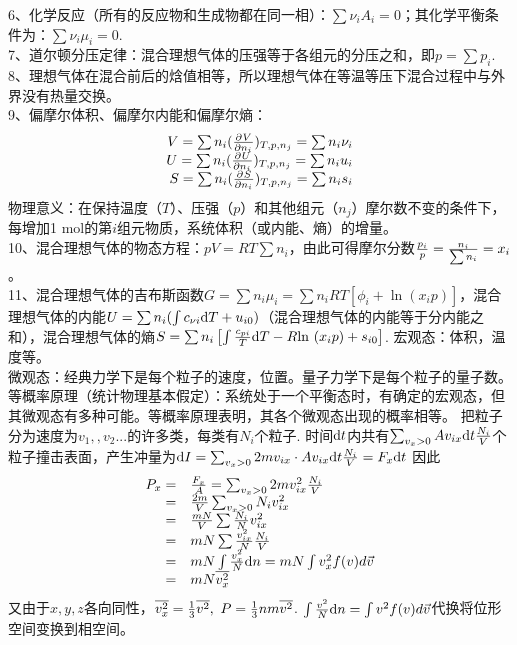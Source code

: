 \documentclass[UTF8,9pt]{ctexart}
\begin{document}
6、化学反应（所有的反应物和生成物都在同一相）：$\sum\nu_iA_i=0$；其化学平衡条件为：$\sum\nu_i\mu_i=0$.\\
7、道尔顿分压定律：混合理想气体的压强等于各组元的分压之和，即$p=\sum p_i$.\\
8、理想气体在混合前后的焓值相等，所以理想气体在等温等压下混合过程中与外界没有热量交换。\\
9、偏摩尔体积、偏摩尔内能和偏摩尔熵：
$$\begin{array}{rl} 
    V=\sum n_i(\frac{\partial^{} V}{\partial {n_i}^{}})_{T,p,n_j}=\sum n_i\nu_i\\
    U=\sum n_i(\frac{\partial^{} U}{\partial {n_i}^{}})_{T,p,n_j}=\sum n_iu_i\\
    S=\sum n_i(\frac{\partial^{} S}{\partial {n_i}^{}})_{T,p,n_j}=\sum n_is_i
 \end{array}$$
物理意义：在保持温度（$T$）、压强（$p$）和其他组元（$n_j$）摩尔数不变的条件下，每增加1 mol的第$i$组元物质，系统体积（或内能、熵）的增量。\\
10、混合理想气体的物态方程：$pV= RT\sum n_i$，由此可得摩尔分数$\frac{p_i}{p}=\frac{n_i}{\sum n_i}=x_i$。\\
11、混合理想气体的吉布斯函数$G=\sum n_i\mu_i=\sum n_iRT\left[\phi_i+\ln(x_ip)\right]$，混合理想气体的内能$U=\sum n_i(\int c_{\nu i}\mathrm{d} T+u_{i0})$（混合理想气体的内能等于分内能之和），混合理想气体的熵$S=\sum n_i\left[\int\frac{c_{pi}}{T}\mathrm{d} T-R\mathrm{ln}\ (x_ip)+s_{i0}\right]$. 
    宏观态：体积，温度等。\\
    微观态：经典力学下是每个粒子的速度，位置。量子力学下是每个粒子的量子数。\\
    等概率原理（统计物理基本假定）：系统处于一个平衡态时，有确定的宏观态，但其微观态有多种可能。等概率原理表明，其各个微观态出现的概率相等。
    把粒子分为速度为$v_1,,v_2...$的许多类，每类有$N_i$个粒子. 时间$\mathrm{d} t$内共有$\sum_{v_x>0} Av_{ix}\mathrm{d} t\frac{N_i}{V}$个粒子撞击表面，产生冲量为$\mathrm{d} I=\sum_{v_x>0} 2mv_{ix} \cdot Av_{ix}\mathrm{d} t\frac{N_i}{V}=F_x\mathrm{d} t$
    因此
    $$\begin{array}{rl} 
        P_x=&\frac{F_x}{A}=\sum_{v_x>0} 2mv_{ix}^2\frac{N_i}{V}\\
        =&\frac{2m}{V}\sum_{v_x>0} N_iv_{ix}^2\\
        =&\frac{mN}{V}\sum \frac{N_i}{N}v_{ix}^2\\
        =& mN\sum \frac{v_{ix}^2}{N}\frac{N_i}{V}\\
        =&mN\int \frac{v_x^2}{N}\mathrm{d} n=mN\int v_x^2f(v)d\vec{v}\\
        =&mN\overline{v_x^2}
     \end{array}$$
    又由于$x,y,z$各向同性，$\bar{v_x^2}=\ff{3}\bar{v^2},\ P=\ff{3}nm\bar{v^2}$.
    $\int \frac{v^2}{N}\mathrm{d} n=\int v^2f(v)d\vec{v}$代换将位形空间变换到相空间。\\
\end{document}
